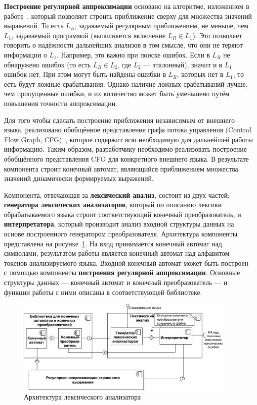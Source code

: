 \textbf{Построение регулярной аппроксимации} основано на алгоритме, изложенном в работе~\cite{RegOverApprox}, который позволяет строить приближение сверху для множества значений выражений. То есть $L_R$, задаваемый регулярным приближением, не меньше, чем $L_1$, задаваемый программой (выполняется включение $L_R \in L_1$). Это позволяет говорить о надёжности дальнейших анализов в том смысле, что они не теряют информации о $L_1$. Например, это важно при поиске ошибок. Если в $L_R$ не обнаружено ошибок (то есть $L_R \in L_2$, где $L_2$ --- эталонный), значит и в $L_1$ ошибок нет. При этом могут быть найдены ошибки в $L_R$, которых нет в $L_1$, то есть будут ложные срабатывания. Однако наличие ложных срабатываний лучше, чем пропущенные ошибки, и их количество может быть уменьшено путём повышения точности аппроксимации. 

Для того чтобы сделать построение приближения независимым от внешнего языка, реализовано обобщённое представление графа потока управления (Control Flow Graph, CFG)~\cite{Dragon}, которое содержит всю необходимую для дальнейшей работы информацию. Таким образом, разработчику необходимо реализовать построение обобщённого представления CFG для конкретного внешнего языка. В результате компонента строит конечный автомат, являющийся приближением множества значений динамически формируемых выражений.

Компонента, отвечающая за \textbf{лексический анализ}, состоит из двух частей: \textbf{генератора лексических анализаторов}, который по описанию лексики обрабатываемого языка строит соответствующий конечный преобразователь, и \textbf{интерпретатора}, который производит анализ входной структуры данных на основе построенного генератором преобразователя. Архитектура компоненты представлена на рисунке~\ref{fig:LexArch}. На вход принимается конечный автомат над символами, результатом работы является конечный автомат над алфавитом токенов анализируемого языка. Входной конечный автомат может быть построен с помощью компоненты \textbf{построения регулярной аппроксимации}. Основные структуры данных --- конечный автомат и конечный преобразователь --- и функции работы с ними описаны в соответствующей библиотеке.

\begin{figure}[h!]
\begin{center}
\includegraphics[width=0.95\textwidth]{pics/LexerDiagram}
\caption{Архитектура лексического анализатора}
\label{fig:LexArch} 
\end{center}
\end{figure}

